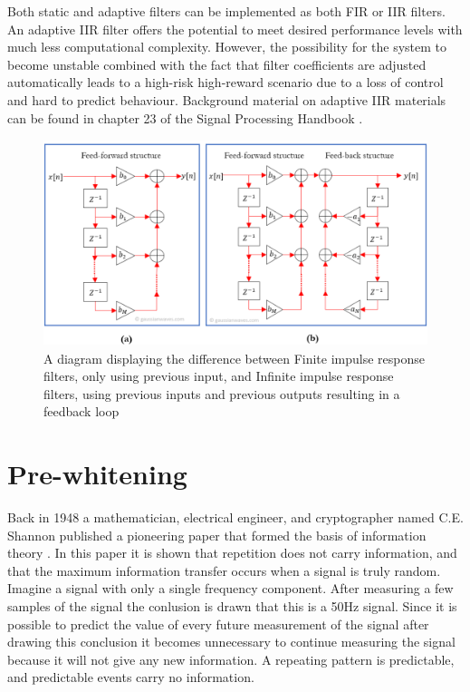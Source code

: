 Both static and adaptive filters can be implemented as both FIR or IIR filters. An adaptive IIR filter offers the potential to meet desired performance levels with much less computational complexity. However, the possibility for the system to become unstable combined with the fact that filter coefficients are adjusted automatically leads to a high-risk high-reward scenario due to a loss of control and hard to predict behaviour. Background material on adaptive IIR materials can be found in chapter 23 of the Signal Processing Handbook \cite{digital_signal_processing_handbook}.

\begin{figure}[h!t]
	\begin{center}
		\includegraphics[height=60mm]{images/fir_vs_iir_diagram.png}
	\end{center}
	\caption{A diagram displaying the difference between Finite impulse response filters, only using previous input, and Infinite impulse response filters, using previous inputs and previous outputs resulting in a feedback loop \cite{fir_vs_iir_diagram}}
	\label{fig:fir_vs_iir_diagram}
\end{figure}


\section{Pre-whitening}
Back in 1948 a mathematician, electrical engineer, and cryptographer named C.E. Shannon published a pioneering paper that formed the basis of information theory \cite{shannon}. In this paper it is shown that repetition does not carry information, and that the maximum information transfer occurs when a signal is truly random. Imagine a signal with only a single frequency component. After measuring a few samples of the signal the conlusion is drawn that this is a 50Hz signal. Since it is possible to predict the value of every future measurement of the signal after drawing this conclusion it becomes unnecessary to continue measuring the signal because it will not give any new information. A repeating pattern is predictable, and predictable events carry no information.

